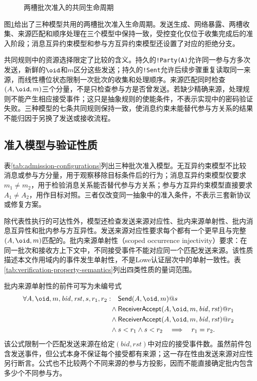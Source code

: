 \begin{figure}[!t]
  \centering
  
  \caption{两槽批次准入的共同生命周期}
  \label{fig:two-slot-lifecycle}
\end{figure}

图\ref{fig:two-slot-lifecycle}给出了三种模型共用的两槽批次准入生命周期。发送生成、网络暴露、两槽收集、来源匹配和顺序处理在三个模型中保持一致，受控变化仅位于收集完成后的准入阶段；消息互异约束模型和参与方互异约束模型还设置了对应的拒绝分支。

共同规则中的资源选择限定了比较的含义。持久的\texttt{!Party(A)}允许同一参与方多次发送，新鲜的$\oid$和$m$区分这些发送；持久的\texttt{!Sent}允许后续步骤重复读取同一来源，而线性槽位状态限制一次批次的收集和处理顺序。来源匹配同时检查$(A,\oid,m)$三个分量，不是只检查参与方是否曾发送。若缺少精确来源，处理规则不能产生相应接受事件；这只是抽象规则的使能条件，不表示实现中的密码验证失败。三种模型的七条共同规则保持一致，使消息约束未能替代参与方关系的结果不能归因于另换了发送或接收流程。

\subsection{准入模型与验证性质}
\label{subsec:configurations-properties}

表\ref{tab:admission-configurations}列出三种批次准入模型。无互异约束模型不比较消息或参与方分量，用于观察移除目标条件后的行为；消息互异约束模型仅要求$m_1\neq m_2$，用于检验消息关系能否替代参与方关系；参与方互异约束模型直接要求$A_1\neq A_2$，用作目标对照。三者仅改变同一抽象中的准入条件，不表示三套新协议或修复方案。



除代表性执行的可达性外，模型还检查发送来源对应性、批内来源单射性、批内消息互异性和批内参与方互异性。发送来源对应性要求每个\receiveraccept 都有一个更早且与完整$(A,\oid,m)$匹配的\sendaction。批内来源单射性（scoped occurrence injectivity）要求：在同一批次和接收方上下文中，不同接受事件不能对应同一个匹配发送来源。该性质描述本文作用域内的事件发生单射性，不是Lowe认证层次中的单射一致性\cite{lowe1997hierarchy}。表\ref{tab:verification-property-semantics}列出四类性质的量词范围。



批内来源单射性的前件可写为未编号式
\[
\begin{aligned}
  \forall A,\oid,m,\mathit{bid},\mathit{rst},s,r_1,r_2:\quad
  &\mathsf{Send}(A,\oid,m)@s \\
  {}\land{}&\mathsf{ReceiverAccept}(A,\oid,m,\mathit{bid},\mathit{rst})@r_1 \\
  {}\land{}&\mathsf{ReceiverAccept}(A,\oid,m,\mathit{bid},\mathit{rst})@r_2 \\
  {}\land{}&s<r_1\land s<r_2
  \quad\Longrightarrow\quad r_1=r_2.
\end{aligned}
\]
该公式限制一个匹配发送来源在给定$(\mathit{bid},\mathit{rst})$中对应的接受事件数。虽然前件包含发送事件，但公式本身不保证每个接受都有来源；这一存在性由发送来源对应性另行断言。公式也不比较两个不同来源的参与方投影，因而不能直接确定批内包含多少个不同参与方。

